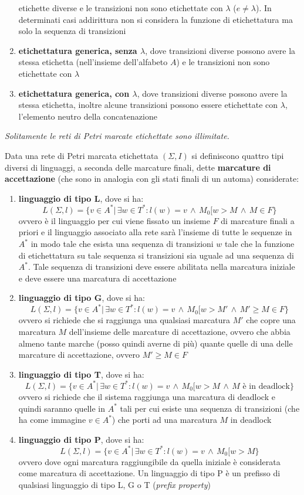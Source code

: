 \documentclass[a4paper,12pt, oneside]{book}
\begin{document}
\begin{definizione}
\begin{enumerate}
    etichette diverse e le transizioni non sono etichettate con $\lambda$
    ($e\neq \lambda$). In determinati casi addirittura non si considera la
    funzione di etichettatura ma solo la sequenza di transizioni
    \item \textbf{etichettatura generica, senza $\lambda$}, dove transizioni
    diverse possono avere la stessa etichetta (nell'insieme dell'alfabeto $A$) e
    le transizioni non sono etichettate con $\lambda$ 
    \item \textbf{etichettatura generica, con $\lambda$}, dove transizioni
    diverse possono avere la stessa etichetta, inoltre alcune transizioni
    possono essere etichettate con $\lambda$, l’elemento neutro della
    concatenazione
  \end{enumerate}
  \textit{Solitamente le reti di Petri marcate etichettate sono illimitate.}
\end{definizione}
Data una rete di Petri marcata etichettata $(\Sigma, I)$ si definiscono quattro
tipi diversi di linguaggi, a seconda delle marcature finali, dette
\textbf{marcature di accettazione} (che sono in analogia con gli stati finali di
un automa) considerate: 
\begin{enumerate}
  \item \textbf{linguaggio di tipo L}, dove si ha:
  \[L(\Sigma,l)=\{v\in A^*|\,\exists w\in T^*:l(w)=v\,\land\, M_0[w>M\,\land\,
    M\in F\}\]
  ovvero è il linguaggio per cui viene fissato un insieme $F$ di marcature
  finali a priori e il linguaggio associato alla rete sarà l'insieme di tutte le
  sequenze in $A^*$ in modo tale che esista una sequenza di transizioni $w$ tale
  che la funzione di etichettatura su tale sequenza si transizioni sia uguale
  ad una sequenza di $A^*$. Tale sequenza di transizioni deve essere abilitata
  nella marcatura iniziale e deve essere una marcatura di accettazione
  \item \textbf{linguaggio di tipo G}, dove si ha:
  \[L(\Sigma,l)=\{v\in A^*|\,\exists w\in T^*:l(w)=v\,\land\, M_0[w>M'\,\land\,
    M'\geq M\in F\}\]
  ovvero si richiede che si raggiunga una qualsiasi marcatura $M'$ che copre una
  marcatura $M$ dell'insieme delle marcature di accettazione, ovvero che abbia
  almeno tante marche (posso quindi averne di più) quante quelle di una delle
  marcature di accettazione, ovvero $M'\geq M\in F$
  \item \textbf{linguaggio di tipo T}, dove si ha:
  \[L(\Sigma,l)=\{v\in A^*|\,\exists w\in T^*:l(w)=v\,\land\, M_0[w>M\,\land\,
    M \mbox{ è in deadlock}\}\]
  ovvero si richiede che il sistema raggiunga una marcatura di deadlock e quindi
  saranno quelle in $A^*$ tali per cui esiste una sequenza di transizioni (che
  ha come immagine $v\in A^*$) che porti ad una marcatura $M$ in deadlock
  \item \textbf{linguaggio di tipo P}, dove si ha:
  \[L(\Sigma,l)=\{v\in A^*|\,\exists w\in T^*:l(w)=v\,\land\, M_0[w>M\}\]
  ovvero dove ogni marcatura raggiungibile da quella iniziale è considerata come
  marcatura di accettazione. Un linguaggio di tipo P è un prefisso di qualsiasi
  linguaggio di tipo L, G o T (\textit{prefix property})
\end{enumerate}
\end{document}
